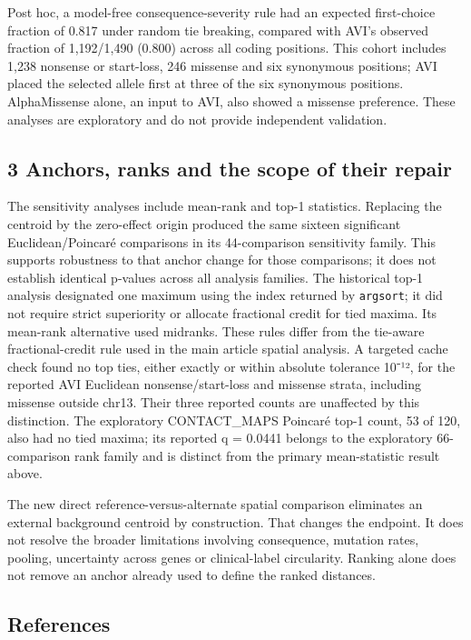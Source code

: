 \documentclass[
  11pt,
]{article}
\begin{document}
Post hoc, a model-free consequence-severity rule had an expected
first-choice fraction of 0.817 under random tie breaking, compared with
AVI's observed fraction of 1,192/1,490 (0.800) across all coding
positions. This cohort includes 1,238 nonsense or start-loss, 246
missense and six synonymous positions; AVI placed the selected allele
first at three of the six synonymous positions. AlphaMissense alone, an
input to AVI, also showed a missense preference. These analyses are
exploratory and do not provide independent validation.

\subsection{3 Anchors, ranks and the scope of their
repair}\label{anchors-ranks-and-the-scope-of-their-repair}

The sensitivity analyses include mean-rank and top-1 statistics.
Replacing the centroid by the zero-effect origin produced the same
sixteen significant Euclidean/Poincaré comparisons in its 44-comparison
sensitivity family. This supports robustness to that anchor change for
those comparisons; it does not establish identical p-values across all
analysis families. The historical top-1 analysis designated one maximum
using the index returned by \texttt{argsort}; it did not require strict
superiority or allocate fractional credit for tied maxima. Its mean-rank
alternative used midranks. These rules differ from the tie-aware
fractional-credit rule used in the main article spatial analysis. A
targeted cache check found no top ties, either exactly or within
absolute tolerance 10⁻¹², for the reported AVI Euclidean
nonsense/start-loss and missense strata, including missense outside
chr13. Their three reported counts are unaffected by this distinction.
The exploratory CONTACT\_MAPS Poincaré top-1 count, 53 of 120, also had
no tied maxima; its reported q = 0.0441 belongs to the exploratory
66-comparison rank family and is distinct from the primary
mean-statistic result above.

The new direct reference-versus-alternate spatial comparison eliminates
an external background centroid by construction. That changes the
endpoint. It does not resolve the broader limitations involving
consequence, mutation rates, pooling, uncertainty across genes or
clinical-label circularity. Ranking alone does not remove an anchor
already used to define the ranked distances.

\subsection{References}\label{references}
\end{document}
